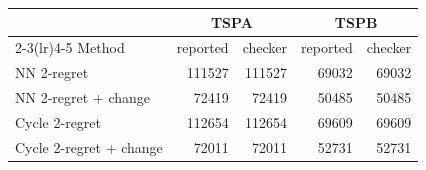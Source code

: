 \begin{tabular}{lrrrr}
\toprule
 & \multicolumn{2}{c}{TSPA} & \multicolumn{2}{c}{TSPB} \\
\cmidrule(lr){2-3}\cmidrule(lr){4-5}
Method & reported & checker & reported & checker \\
\midrule
NN 2-regret & 111527 & 111527 & 69032 & 69032 \\
NN 2-regret + change & 72419 & 72419 & 50485 & 50485 \\
Cycle 2-regret & 112654 & 112654 & 69609 & 69609 \\
Cycle 2-regret + change & 72011 & 72011 & 52731 & 52731 \\
\bottomrule
\end{tabular}
